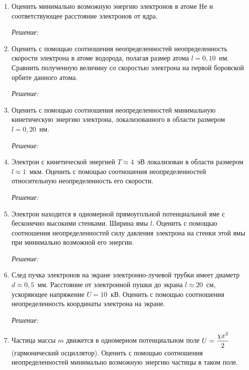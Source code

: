 \begin{enumerate}
\item Оценить минимально возможную энергию электронов в атоме Не и
соответствующее расстояние электронов от ядра.

\emph{Решение:}

\newpage

\item Оценить с помощью соотношения неопределенностей неопределенность скорости
электрона в атоме водорода, полагая размер атома \( l = 0,\!10 \)~нм. Сравнить
полученную величину со скоростью электрона на первой боровской орбите данного
атома.

\emph{Решение:}

\newpage

\item Оценить с помощью соотношения неопределенностей минимальную кинетическую
энергию электрона, локализованного в области размером \( l = 0,\!20 \)~нм.

\emph{Решение:}

\newpage

\item Электрон с кинетической энергией \( T \approx 4 \)~эВ локализован в
области размером \( l \approx 1 \)~мкм. Оценить с помощью соотношения
неопределенностей относительную неопределенность его скорости.

\emph{Решение:}

\newpage

\item Электрон находится в одномерной прямоугольной потенциальной яме с
бесконечно высокими стенками. Ширина ямы \( l \). Оценить с помощью соотношения
неопределенностей силу давления электрона на стенки этой ямы при минимально
возможной его энергии.

\emph{Решение:}

\newpage

\item След пучка электронов на экране электронно-лучевой трубки имеет диаметр
\( d \approx 0,\!5 \)~мм. Расстояние от электронной пушки до экрана
\( l \approx 20 \)~см, ускоряющее напряжение \( U = 10 \)~кВ. Оценить с помощью
соотношения неопределенность координаты электрона на экране.

\emph{Решение:}

\newpage

\item Частица массы \( m \) движется в одномерном потенциальном поле
\( U = \cfrac{\chi x^2}{2} \) (гармонический осциллятор). Оценить с помощью
соотношения неопределенностей минимально возможную энергию частицы в таком поле.


\end{enumerate}
